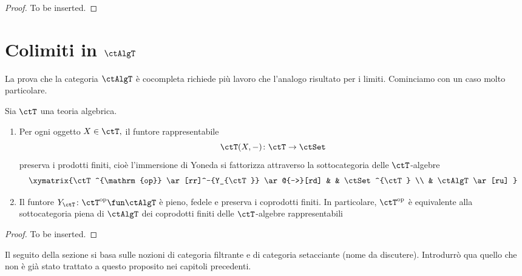 \begin{proof}
To be inserted.
\end{proof}

\section{Colimiti in $\ctAlgT$}\label{sec_colim_AlgT}

La prova che la categoria $\ctAlgT$ è cocompleta richiede più lavoro che l'analogo risultato per i limiti. Cominciamo con un caso 
molto particolare.

\begin{proposition}\label{prop_Yoneda_alg}
Sia $\ctT$ una teoria algebrica.
\begin{enumerate}
\item Per ogni oggetto $X \in \ctT,$ il funtore rappresentabile
$$\ctT(X,-) \colon \ctT \to \ctSet$$
preserva i prodotti finiti, cioè l'immersione di Yoneda si fattorizza attraverso la sottocategoria delle $\ctT$-algebre
$$\xymatrix{\ctT^{\mathrm{op}} \ar[rr]^-{Y_{\ctT}} \ar@{-->}[rd] & & \ctSet^{\ctT} \\
& \ctAlgT \ar[ru] }$$
\item Il funtore $Y_{\ctT} \colon \ctT^{\mathrm{op}} \fun \ctAlgT$ è pieno, fedele e preserva i coprodotti finiti. In particolare,
$\ctT^{\mathrm{op}}$ è equivalente alla sottocategoria piena di $\ctAlgT$ dei coprodotti finiti delle $\ctT$-algebre rappresentabili
\end{enumerate}
\end{proposition}

\begin{proof}
To be inserted.
\end{proof}

\begin{warning}\label{caveat_filtr_sift}
Il seguito della sezione si basa sulle nozioni di categoria filtrante e di categoria setacciante (nome da discutere). Introdurrò qua
quello che non è già stato trattato a questo proposito nei capitoli precedenti.
\end{warning} 

